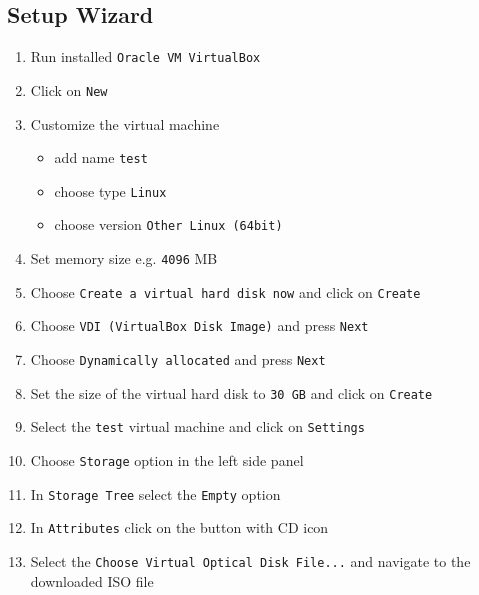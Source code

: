\subsection{Setup Wizard}\label{setup-wizard}

\begin{enumerate}
\def\labelenumi{\arabic{enumi}.}
\tightlist
\item
  Run installed \texttt{Oracle\ VM\ VirtualBox}
\item
  Click on \texttt{New}
\item
  Customize the virtual machine

  \begin{itemize}
  \tightlist
  \item
    add name \texttt{test}
  \item
    choose type \texttt{Linux}
  \item
    choose version \texttt{Other\ Linux\ (64bit)}
  \end{itemize}
\item
  Set memory size e.g. \texttt{4096} MB
\item
  Choose \texttt{Create\ a\ virtual\ hard\ disk\ now} and click on
  \texttt{Create}
\item
  Choose \texttt{VDI\ (VirtualBox\ Disk\ Image)} and press \texttt{Next}
\item
  Choose \texttt{Dynamically\ allocated} and press \texttt{Next}
\item
  Set the size of the virtual hard disk to \texttt{30\ GB} and click on
  \texttt{Create}
\item
  Select the \texttt{test} virtual machine and click on
  \texttt{Settings}
\item
  Choose \texttt{Storage} option in the left side panel
\item
  In \texttt{Storage\ Tree} select the \texttt{Empty} option
\item
  In \texttt{Attributes} click on the button with CD icon
\item
  Select the \texttt{Choose\ Virtual\ Optical\ Disk\ File...} and
  navigate to the downloaded ISO file


\end{enumerate}
